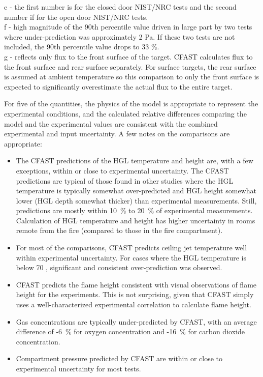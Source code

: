 \begin{table}
e - the first number is for the closed door NIST/NRC tests and the second number if for the open door NIST/NRC tests. \\
f - high magnitude of the 90th percentile value driven in large part by two tests where under-prediction was approximately 2 Pa. If these two tests are not included, the 90th percentile value drops to 33 \%. \\
g - reflects only flux to the front surface of the target.  CFAST calculates flux to the front surface and rear surface separately.  For surface targets, the rear surface is assumed at ambient temperature so this comparison to only the front surface is expected to significantly overestimate the actual flux to the entire target.
\end{table}

For five of the quantities,  the physics of the model is appropriate to represent the experimental conditions, and the calculated relative differences comparing the model and the experimental values are consistent with the combined experimental and input uncertainty.  A few notes on the comparisons are appropriate:

\begin{itemize}
\item The CFAST predictions of the HGL temperature and height are, with a few exceptions, within or close to experimental uncertainty.  The CFAST predictions are typical of those found in other studies where the HGL temperature is typically somewhat over-predicted and HGL height somewhat lower (HGL depth somewhat thicker) than experimental measurements.  Still, predictions are mostly within 10~\% to 20~\% of experimental measurements.  Calculation of HGL temperature and height has higher uncertainty in rooms remote from the fire (compared to those in the fire compartment).
\item For most of the comparisons, CFAST predicts ceiling jet temperature well within experimental uncertainty.  For cases where the HGL temperature is below 70 \degc, significant and consistent over-prediction was observed.
\item CFAST predicts the flame height consistent with visual observations of flame height for the experiments.  This is not surprising, given that CFAST simply uses a well-characterized experimental correlation to calculate flame height.
\item Gas concentrations are typically under-predicted by CFAST, with an average difference of -6~\% for oxygen concentration and -16~\% for carbon dioxide concentration. 
\item Compartment pressure predicted by CFAST are within or close to experimental uncertainty for most tests.
\end{itemize}


